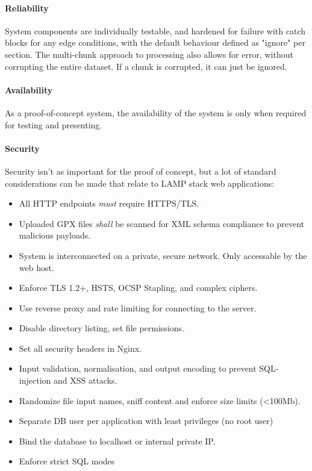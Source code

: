 \documentclass[11pt,twoside]{report}
\begin{document}
\paragraph{Reliability}
System components are individually testable, and hardened for failure with catch blocks for any edge conditions, with the default behaviour defined
as "ignore" per section. The multi-chunk approach to processing also allows for error, without corrupting the entire dataset. If a chunk is corrupted,
it can just be ignored.

\paragraph{Availability}
As a proof-of-concept system, the availability of the system is only when required for testing and presenting.

\paragraph{Security}
Security isn't as important for the proof of concept, but a lot of standard considerations can be made that relate to LAMP stack web applications:
\begin{itemize}
	\item All HTTP endpoints \emph{must} require HTTPS/TLS.
	\item Uploaded GPX files \emph{shall} be scanned for XML schema compliance to prevent malicious payloads.
	\item System is interconnected on a private, secure network. Only accessable by the web host.
	\item Enforce TLS 1.2+, HSTS, OCSP Stapling, and complex ciphers.
	\item Use reverse proxy and rate limiting for connecting to the server.
	\item Disable directory listing, set file permissions.
	\item Set all security headers in Nginx.
	\item Input validation, normalisation, and output encoding to prevent SQL-injection and XSS attacks.
	\item Randomize file input names, sniff content and enforce size limits (<100Mb).
	\item Separate DB user per application with least privileges (no root user)
	\item Bind the database to localhost or internal private IP.
	\item Enforce strict SQL modes
\end{itemize}
\end{document}
